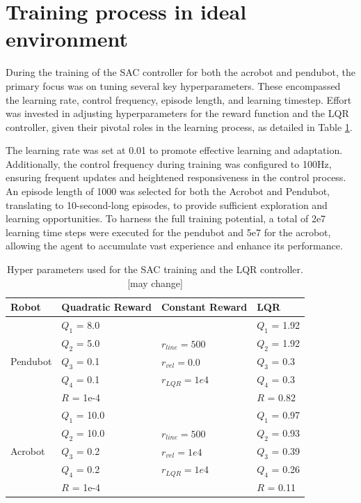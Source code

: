 \section{Training process in ideal environment}
During the training of the SAC controller for both the acrobot and pendubot, the primary focus was on tuning several key hyperparameters. These encompassed the learning rate, control frequency, episode length, and learning timestep. Effort was invested in adjusting hyperparameters for the reward function and the LQR controller, given their pivotal roles in the learning process, as detailed in Table \ref{tab:training_parameters}.

The learning rate was set at 0.01 to promote effective learning and adaptation. Additionally, the control frequency during training was configured to 100Hz, ensuring frequent updates and heightened responsiveness in the control process. An episode length of 1000 was selected for both the Acrobot and Pendubot, translating to 10-second-long episodes, to provide sufficient exploration and learning opportunities. To harness the full training potential, a total of 2e7 learning time steps were executed for the pendubot and 5e7 for the acrobot, allowing the agent to accumulate vast experience and enhance its performance.

\begin{table}[H]
  \centering
  \begin{tabular}{p{2cm} | p{3cm} | p{3cm} | p{3cm}}
  Robot & Quadratic Reward  & Constant Reward & LQR\\
  \hline
  \multirow{5}{*}{Pendubot} & \(Q_1\) = 8.0  &  & \(Q_1\) = 1.92\\
  & \(Q_2\) = 5.0  & \(r_{line}=500\) & \(Q_2\) = 1.92\\
  & \(Q_3\) = 0.1  & \(r_{vel}=0.0\) & \(Q_3\) = 0.3\\
  & \(Q_4\) = 0.1  & \(r_{LQR}=1e4\)& \(Q_4\) = 0.3\\
  & \(R\) = 1e-4  & & \(R\) = 0.82\\
  \hline
  \multirow{5}{*}{Acrobot} & \(Q_1\) = 10.0  &  & \(Q_1\) = 0.97\\
  & \(Q_2\) = 10.0  & \(r_{line}=500\) & \(Q_2\) = 0.93\\
  & \(Q_3\) = 0.2  & \(r_{vel}=1e4\) & \(Q_3\) = 0.39\\
  & \(Q_4\) = 0.2  & \(r_{LQR}=1e4\) & \(Q_4\) = 0.26\\
  & \(R\) = 1e-4  &  & \(R\) = 0.11\\
  \end{tabular}
 \caption{Hyper parameters used for the SAC training and the LQR controller.[may change]}
 \label{tab:training_parameters}
\end{table}

